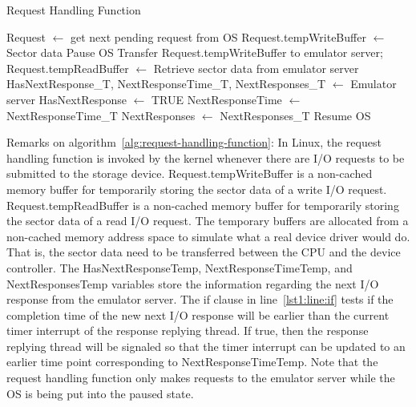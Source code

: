 \begin{algorithm}
\small
\newcommand*\Let[2]{\State #1 $\gets$ #2}
	\caption{Request Handling Function
		\label{alg:request-handling-function}}
	\begin{algorithmic}[1]
		\Let{Request}{get next pending request from OS}
			\Let{Request.tempWriteBuffer}{Sector data}
		\EndIf
		\State Pause OS
		\If{Request is a write request}
			\State Transfer Request.tempWriteBuffer to emulator server;
		\Else
			\Let{Request.tempReadBuffer}{Retrieve sector data from emulator server}
		\EndIf
		\Let{HasNextResponse_T, NextResponseTime_T, NextResponses_T}{Emulator server}
		 \label{lst1:line:if}
			\Let{HasNextResponse}{TRUE}
			\Let{NextResponseTime}{NextResponseTime_T}\label{lst1:line:assignNextResponseTime}
			\Let{NextResponses}{NextResponses_T}
			\label{lst1:line:signal}
		\EndIf
		\State Resume OS

		\EndFunction
	\end{algorithmic}
\end{algorithm}

Remarks on algorithm~\ref{alg:request-handling-function}: In Linux, the request handling function is invoked by the kernel whenever there are I/O requests to be submitted to the storage device. Request.tempWriteBuffer is a non-cached memory buffer for temporarily storing the sector data of a write I/O request. Request.tempReadBuffer is a non-cached memory buffer for temporarily storing the sector data of a read I/O request. The temporary buffers are allocated from a non-cached memory address space to simulate what a real device driver would do. That is, the sector data need to be transferred between the CPU and the device controller. The HasNextResponseTemp, NextResponseTimeTemp, and NextResponsesTemp variables store the information regarding the next I/O response from the emulator server. The if clause in line~\ref{lst1:line:if} tests if the completion time of the new next I/O response will be earlier than the current timer interrupt of the response replying thread. If true, then the response replying thread will be signaled so that the timer interrupt can be updated to an earlier time point corresponding to NextResponseTimeTemp. Note that the request handling function only makes requests to the emulator server while the OS is being put into the paused state.

